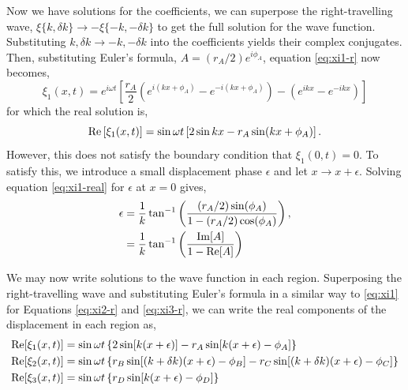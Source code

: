 Now we have solutions for the coefficients, we can superpose the right-travelling wave, \(\xi\{k, \delta k\} \rightarrow - \xi\{-k, -\delta k\}\) to get the full solution for the wave function. Substituting \(k, \delta k \rightarrow -k, -\delta k\) into the coefficients yields their complex conjugates. Then, substituting Euler's formula, \(A = (r_A/2) e^{i\phi_A}\), equation \ref{eq:xi1-r} now becomes,
%
\begin{equation}
    \xi_1(x, t) = e^{i \omega t} \left[ \frac{r_A}{2} \left( e^{i(kx + \phi_A)} - e^{-i(kx + \phi_A)} \right) - \left( e^{ikx} - e^{-ikx} \right) \right] \label{eq:xi1}
\end{equation}
%
for which the real solution is,
\begin{equation}
    {\mathrm{Re}}\left[\xi_1(x, t)\right] = \sin \omega t \left[2 \sin kx - r_A \sin(kx + \phi_A)\right]. \label{eq:xi1-real}
\end{equation}
%
However, this does not satisfy the boundary condition that \(\xi_1(0, t) = 0\). To satisfy this, we introduce a small displacement phase \(\epsilon\) and let \(x \rightarrow x + \epsilon\). Solving equation \ref{eq:xi1-real} for \(\epsilon\) at \(x=0\) gives,
%
\begin{align}
    \epsilon &= \frac{1}{k} \tan^{-1}\left( \frac{(r_A / 2) \sin(\phi_A)}{1 - (r_A/2) \cos(\phi_A)} \right), \\
    &= \frac{1}{k} \tan^{-1}\left( \frac{{\mathrm{Im}}[A]}{1 - {\mathrm{Re}}[A]} \right)
\end{align}
%

We may now write solutions to the wave function in each region. Superposing the right-travelling wave and substituting Euler's formula in a similar way to \ref{eq:xi1} for Equations \ref{eq:xi2-r} and \ref{eq:xi3-r}, we can write the real components of the displacement in each region as,
%
%
%
\begin{align}
    {\mathrm{Re}}[\xi_1(x, t)] &= \sin \omega t \left\{2 \sin[k (x + \epsilon)] - r_A \sin[k(x + \epsilon) - \phi_A]\right\} \\
    {\mathrm{Re}}[\xi_2(x, t)] &= \sin \omega t \left\{ r_B \sin[(k + \delta k)(x + \epsilon) - \phi_B] - r_C \sin[(k + \delta k)(x + \epsilon) - \phi_C]\right\} \\
    {\mathrm{Re}}[\xi_3(x, t)] &= \sin \omega t \left\{r_D \sin[k(x + \epsilon) - \phi_D]\right\}
\end{align}
%

